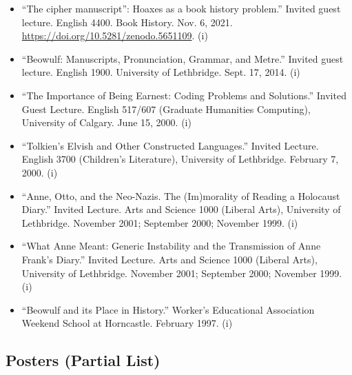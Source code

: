 \documentclass[12pt]{article}
\begin{document}
\begin{itemize}
  \item “The cipher manuscript”: Hoaxes as a book history problem.” Invited guest lecture. English 4400. Book History. Nov. 6, 2021. \url{https://doi.org/10.5281/zenodo.5651109}. (i)
  \item “Beowulf: Manuscripts, Pronunciation, Grammar, and Metre.” Invited guest lecture. English 1900. University of Lethbridge. Sept. 17, 2014. (i)
  \item “The Importance of Being Earnest: Coding Problems and Solutions.” Invited Guest Lecture. English 517/607 (Graduate Humanities Computing), University of Calgary. June 15, 2000. (i)
  \item “Tolkien’s Elvish and Other Constructed Languages.” Invited Lecture. English 3700 (Children’s Literature), University of Lethbridge. February 7, 2000. (i)
  \item “Anne, Otto, and the Neo-Nazis. The (Im)morality of Reading a Holocaust Diary.” Invited Lecture. Arts and Science 1000 (Liberal Arts), University of Lethbridge. November 2001; September 2000; November 1999. (i)
  \item “What Anne Meant: Generic Instability and the Transmission of Anne Frank’s Diary.” Invited Lecture. Arts and Science 1000 (Liberal Arts), University of Lethbridge. November 2001; September 2000; November 1999. (i)
  \item “Beowulf and its Place in History.” Worker’s Educational Association Weekend School at Horncastle. February 1997. (i)
\end{itemize}


\subsection*{Posters (Partial List)}
\end{document}
